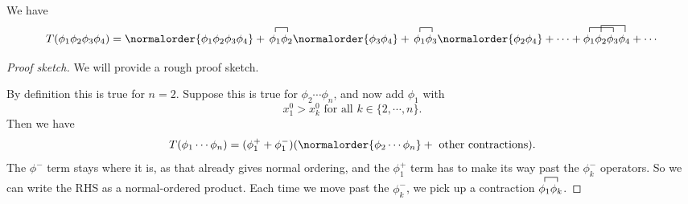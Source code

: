 \documentclass[a4paper]{article}
\begin{document}
\begin{eg}
  We have
  \[
    T(\phi_1 \phi_2 \phi_3 \phi_4) = \normalorder{\phi_1 \phi_2 \phi_3 \phi_4} + \, \contraction{}{\phi_1}{}{\phi_2}\phi_1 \phi_2 \normalorder{ \phi_3 \phi_4} + \, \contraction{}{\phi_1}{}{\phi_3}\phi_1 \phi_3 \normalorder{\phi_2 \phi_4} + \cdots + \contraction{}{\phi_1}{\phi_2}{\phi_3}\contraction[1.5ex]{\phi_1}{\phi_2}{\phi_3}{\phi_4}\phi_1\phi_2\phi_3\phi_4 + \cdots
  \]
\end{eg}

\begin{proof}[Proof sketch]
  We will provide a rough proof sketch.

  By definition this is true for $n = 2$. Suppose this is true for $\phi_2 \cdots \phi_n$, and now add $\phi_1$ with
  \[
    x_1^0 > x_k^0 \text{ for all }k \in \{2, \cdots, n\}.
  \]
  Then we have
  \[
    T(\phi_1 \cdots \phi_n) = (\phi_1^+ + \phi_1^-)(\normalorder{\phi_2 \cdots \phi_n} + \text{ other contractions}).
  \]
  The $\phi^-$ term stays where it is, as that already gives normal ordering, and the $\phi_1^+$ term has to make its way past the $\phi_k^-$ operators. So we can write the RHS as a normal-ordered product. Each time we move past the $\phi_k^-$, we pick up a contraction $\contraction{}{\phi_1}{}{\phi_n}\phi_1\phi_k$. %
\end{proof}
\end{document}
